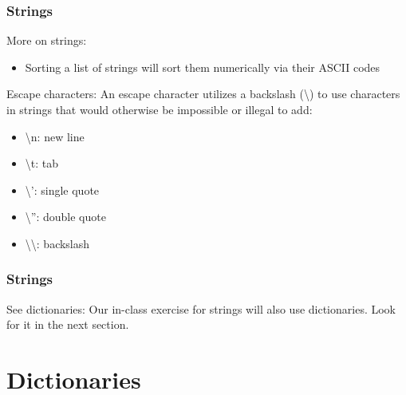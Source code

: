 \documentclass{beamer}
\begin{document}
\begin{frame}	
	\frametitle{Strings}
	
	\begin{block}{More on strings:}
		\begin{itemize}
			\item Sorting a list of strings will sort them numerically via their ASCII codes
		\end{itemize}
	\end{block}
	
	\begin{block}{Escape characters:}
		An escape character utilizes a backslash (\textbackslash ) to use characters in strings that would otherwise be impossible or illegal to add:
		\begin{itemize}
			\item \textbackslash n: new line
			\item \textbackslash t: tab
			\item \textbackslash ': single quote
			\item \textbackslash '': double quote			
			\item \textbackslash\textbackslash : backslash
		\end{itemize}
	\end{block}
	
\end{frame}

\begin{frame}	
	\frametitle{Strings}
	
	\begin{exampleblock}{See dictionaries:}
		Our in-class exercise for strings will also use dictionaries. Look for it in the next section.
	\end{exampleblock}
	
\end{frame}


\section{Dictionaries}

\begin{frame}	
\end{frame}
\end{document}
